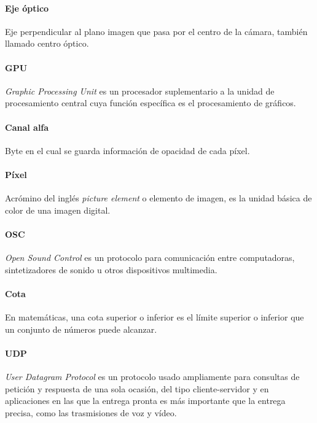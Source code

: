 \paragraph{Eje óptico}
Eje perpendicular al plano imagen que pasa por el centro de la cámara, también llamado centro óptico.

\paragraph{GPU}
\emph{Graphic Processing Unit} es un procesador suplementario a la unidad de procesamiento central cuya función específica es el procesamiento de gráficos.

\paragraph{Canal alfa}
Byte en el cual se guarda información de opacidad de cada píxel.

\paragraph{Píxel}
Acrómino del inglés \emph{picture element} o elemento de imagen, es la unidad básica de color de una imagen digital.

\paragraph{OSC}
\emph{Open Sound Control} es un protocolo para comunicación entre computadoras, sintetizadores de sonido u otros dispositivos multimedia.

\paragraph{Cota}
En matemáticas, una cota superior o inferior es el límite superior o inferior que un conjunto de números puede alcanzar.

\paragraph{UDP}
\emph{User Datagram Protocol} es un protocolo usado ampliamente para consultas de petición y respuesta de una sola ocasión, del tipo cliente-servidor y en aplicaciones en las que la entrega pronta es más importante que la entrega precisa, como las trasmisiones de voz y vídeo.